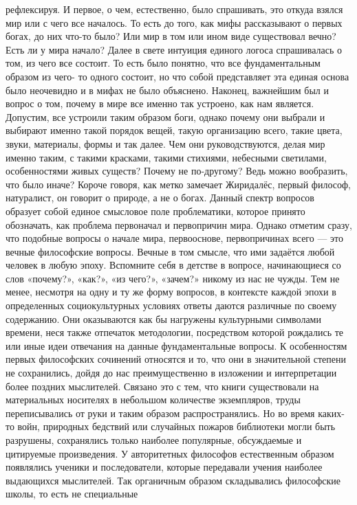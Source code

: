 рефлексируя. И первое, о чем, естественно, было спрашивать, это откуда взялся
мир или с чего все началось. То есть до того, как мифы рассказывают о первых
богах, до них что-то было? Или мир в том или ином виде существовал вечно? Есть
ли у мира начало? Далее в свете интуиция единого логоса спрашивалась о том, из
чего все состоит. То есть было понятно, что все фундаментальным образом из чего-
то одного состоит, но что собой представляет эта единая основа было неочевидно и
в мифах не было объяснено. Наконец, важнейшим был и вопрос о том, почему в мире
все именно так устроено, как нам является. Допустим, все устроили таким образом
боги, однако почему они выбрали и выбирают именно такой порядок вещей, такую
организацию всего, такие цвета, звуки, материалы, формы и так далее. Чем они
руководствуются, делая мир именно таким, с такими красками, такими стихиями,
небесными светилами, особенностями живых существ? Почему не по-другому? Ведь
можно вообразить, что было иначе? Короче говоря, как метко замечает Жиридалёс,
первый философ, натуралист, он говорит о природе, а не о богах. Данный спектр
вопросов образует собой единое смысловое поле проблематики, которое принято
обозначать, как проблема первоначал и первопричин мира. Однако отметим сразу,
что подобные вопросы о начале мира, первооснове, первопричинах всего — это
вечные философские вопросы. Вечные в том смысле, что ими задаётся любой человек
в любую эпоху. Вспомните себя в детстве в вопросе, начинающиеся со слов
«почему?», «как?», «из чего?», «зачем?» никому из нас не чужды. Тем не менее,
несмотря на одну и ту же форму вопросов, в контексте каждой эпохи в определенных
социокультурных условиях ответы даются различные по своему содержанию. Они
оказываются как бы нагружены культурными символами времени, неся также отпечаток
методологии, посредством которой рождались те или иные идеи отвечания на данные
фундаментальные вопросы. К особенностям первых философских сочинений относятся и
то, что они в значительной степени не сохранились, дойдя до нас преимущественно
в изложении и интерпретации более поздних мыслителей. Связано это с тем, что
книги существовали на материальных носителях в небольшом количестве экземпляров,
труды переписывались от руки и таким образом распространялись. Но во время
каких-то войн, природных бедствий или случайных пожаров библиотеки могли быть
разрушены, сохранялись только наиболее популярные, обсуждаемые и цитируемые
произведения. У авторитетных философов естественным образом появлялись ученики и
последователи, которые передавали учения наиболее выдающихся мыслителей. Так
органичным образом складывались философские школы, то есть не специальные
